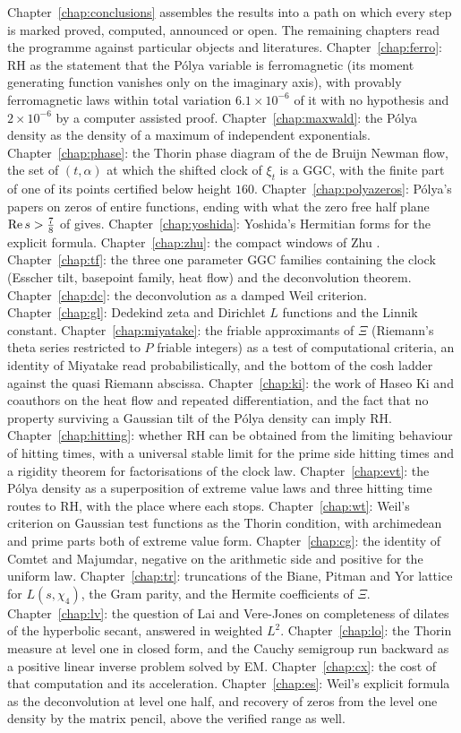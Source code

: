 Chapter~\ref{chap:conclusions} assembles the results into a path on which every step is marked proved, computed, announced or open. The remaining chapters read the programme against particular objects and literatures. Chapter~\ref{chap:ferro}: RH as the statement that the P\'olya variable is ferromagnetic (its moment generating function vanishes only on the imaginary axis), with provably ferromagnetic laws within total variation $6.1\times10^{-6}$ of it with no hypothesis and $2\times10^{-6}$ by a computer assisted proof. Chapter~\ref{chap:maxwald}: the P\'olya density as the density of a maximum of independent exponentials. Chapter~\ref{chap:phase}: the Thorin phase diagram of the de Bruijn Newman flow, the set of $(t,\alpha)$ at which the shifted clock of $\xi_t$ is a GGC, with the finite part of one of its points certified below height $160$. Chapter~\ref{chap:polyazeros}: P\'olya's papers on zeros of entire functions, ending with what the zero free half plane $\operatorname{Re} s>\frac78$ of \cite{OAI26a} gives. Chapter~\ref{chap:yoshida}: Yoshida's Hermitian forms for the explicit formula. Chapter~\ref{chap:zhu}: the compact windows of Zhu \cite{Zhu26}. Chapter~\ref{chap:tf}: the three one parameter GGC families containing the clock (Esscher tilt, basepoint family, heat flow) and the deconvolution theorem. Chapter~\ref{chap:dc}: the deconvolution as a damped Weil criterion. Chapter~\ref{chap:gl}: Dedekind zeta and Dirichlet $L$ functions and the Linnik constant. Chapter~\ref{chap:miyatake}: the friable approximants of $\Xi$ (Riemann's theta series restricted to $P$ friable integers) as a test of computational criteria, an identity of Miyatake read probabilistically, and the bottom of the cosh ladder against the quasi Riemann abscissa. Chapter~\ref{chap:ki}: the work of Haseo Ki and coauthors on the heat flow and repeated differentiation, and the fact that no property surviving a Gaussian tilt of the P\'olya density can imply RH. Chapter~\ref{chap:hitting}: whether RH can be obtained from the limiting behaviour of hitting times, with a universal stable limit for the prime side hitting times and a rigidity theorem for factorisations of the clock law. Chapter~\ref{chap:evt}: the P\'olya density as a superposition of extreme value laws and three hitting time routes to RH, with the place where each stops. Chapter~\ref{chap:wt}: Weil's criterion on Gaussian test functions as the Thorin condition, with archimedean and prime parts both of extreme value form. Chapter~\ref{chap:cg}: the identity of Comtet and Majumdar, negative on the arithmetic side and positive for the uniform law. Chapter~\ref{chap:tr}: truncations of the Biane, Pitman and Yor lattice for $L(s,\chi_4)$, the Gram parity, and the Hermite coefficients of $\Xi$. Chapter~\ref{chap:lv}: the question of Lai and Vere-Jones on completeness of dilates of the hyperbolic secant, answered in weighted $L^2$. Chapter~\ref{chap:lo}: the Thorin measure at level one in closed form, and the Cauchy semigroup run backward as a positive linear inverse problem solved by EM. Chapter~\ref{chap:cx}: the cost of that computation and its acceleration. Chapter~\ref{chap:es}: Weil's explicit formula as the deconvolution at level one half, and recovery of zeros from the level one density by the matrix pencil, above the verified range as well. 